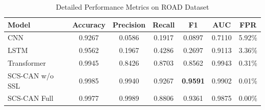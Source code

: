 \begin{table}[t]
\centering
\caption{Detailed Performance Metrics on ROAD Dataset}
\label{tab:detailed}
\small
\begin{tabular}{lcccccc}
\toprule
Model & Accuracy & Precision & Recall & F1 & AUC & FPR \\
\midrule
CNN & 0.9267 & 0.0586 & 0.1917 & 0.0897 & 0.7110 & 5.92\% \\
LSTM & 0.9562 & 0.1967 & 0.4286 & 0.2697 & 0.9113 & 3.36\% \\
Transformer & 0.9945 & 0.8426 & 0.8703 & 0.8562 & 0.9943 & 0.31\% \\
SCS-CAN w/o SSL & 0.9985 & 0.9940 & 0.9267 & \textbf{0.9591} & 0.9902 & 0.01\% \\
SCS-CAN Full & 0.9977 & 0.9989 & 0.8806 & 0.9361 & 0.9875 & 0.00\% \\
\bottomrule
\end{tabular}
\end{table}